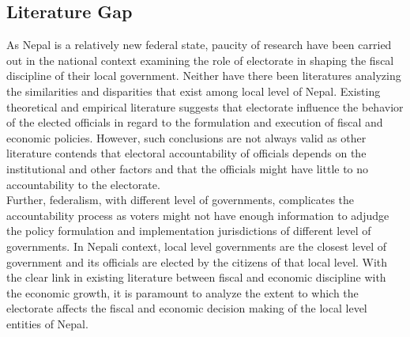  \subsection{Literature Gap}
 As Nepal is a relatively new federal state, paucity of research have been carried out in the national context examining the role of electorate in shaping the fiscal discipline of their local government. Neither have there been literatures analyzing the similarities and disparities that exist among local level of Nepal. Existing theoretical and empirical literature suggests that electorate influence the behavior of the elected officials in regard to the formulation and execution of fiscal and economic policies. However, such conclusions are not always valid as other literature contends that electoral accountability of officials depends on the institutional and other factors and that the officials might have little to no accountability to the electorate.\\
 Further, federalism, with different level of governments, complicates the accountability process as voters might not have enough information to adjudge the policy formulation and implementation jurisdictions of different level of governments. In Nepali context, local level governments are the closest level of government and its officials are elected by the citizens of that local level. With the clear link in existing literature between fiscal and economic discipline with the economic growth, it is paramount to analyze the extent to which the electorate affects the fiscal and economic decision making of the local level entities of Nepal.\\